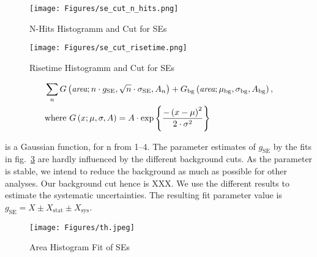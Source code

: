 \begin{figure}
    \centering
    \texttt{[image: Figures/se\_cut\_n\_hits.png]}  %
    \caption[N-Hits Histogramm and Cut for SEs]{
        N-Hits Histogramm and Cut for SEs
    }
    \label{fig:hit-cut-se}
\end{figure}


\begin{figure}
    \centering
    \texttt{[image: Figures/se\_cut\_risetime.png]}  %
    \caption[Risetime Histogramm and Cut for SEs]{
        Risetime Histogramm and Cut for SEs
    }
    \label{fig:riset-cut-se}
\end{figure}


\begin{align}
    &\sum_{n} G \left(  \textit{area}; n \cdot g_\mathrm{SE}, \sqrt{n} \cdot \sigma_\mathrm{SE}, A_n \right) +
    G_\mathrm{bg} \left( \textit{area};  \mu_\mathrm{bg}, \sigma_\mathrm{bg}, A_\mathrm{bg} \right), \\
    &\mathrm{where~} G \left( x;  \mu, \sigma, A \right) = A \cdot \exp{ \left\{ \frac{-\left( x - \mu \right)^2}{2\cdot\sigma^2} \right\} }
    \label{eq:se-fit-model}
\end{align}


is a Gaussian function, for n from \numrange{1}{4}.
The parameter estimates of $ g_\mathrm{SE} $ by the fits in fig.~\ref{fig:se-area-fits} are hardly influenced by the different background cuts.
As the parameter is stable, we intend to reduce the background as much as possible for other analyses.
Our background cut hence is XXX.  %
We use the different results to estimate the systematic uncertainties.
The resulting fit parameter value is $ g_\mathrm{SE} = X \pm X_\mathrm{stat} \pm X_\mathrm{sys} $.  %

\begin{figure}
    \centering
    \texttt{[image: Figures/th.jpeg]}  %
    \caption[Area Histogram Fit of SEs]{
        Area Histogram Fit of SEs
    }
    \label{fig:se-area-fits}
\end{figure}

